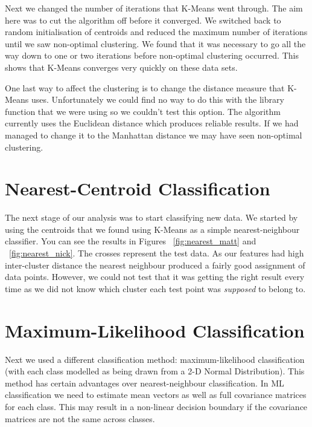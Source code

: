 \documentclass[11pt, a4paper]{article}
\begin{document}
Next we changed the number of iterations that K-Means went through. The aim here was to cut the algorithm off before it converged. We switched back to random initialisation of centroids and reduced the maximum number of iterations until we saw non-optimal clustering. We found that it was necessary to go all the way down to one or two iterations before non-optimal clustering occurred. This shows that K-Means converges very quickly on these data sets. 

One last way to affect the clustering is to change the distance measure that K-Means uses. Unfortunately we could find no way to do this with the library function that we were using so we couldn't test this option. The algorithm currently uses the Euclidean distance which produces reliable results. If we had managed to change it to the Manhattan distance we may have seen non-optimal clustering.

\section{Nearest-Centroid Classification}
The next stage of our analysis was to start classifying new data. We started by using the centroids that we found using K-Means as a simple nearest-neighbour classifier. You can see the results in Figures ~\ref{fig:nearest_matt} and ~\ref{fig:nearest_nick}. The crosses represent the test data. As our features had high inter-cluster distance the nearest neighbour produced a fairly good assignment of data points. However, we could not test that it was getting the right result every time as we did not know which cluster each test point was \textit{supposed} to belong to.





\section{Maximum-Likelihood Classification}
Next we used a different classification method: maximum-likelihood classification (with each class modelled as being drawn from a 2-D Normal Distribution). This method has certain advantages over nearest-neighbour classification. In ML classification we need to estimate mean vectors as well as full covariance matrices for each class. This may result in a non-linear decision boundary if the covariance matrices are not the same across classes. \nocite{ml_wiki} \nocite{mvn_wiki}
\end{document}
